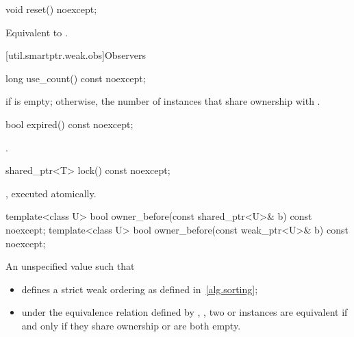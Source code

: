 %
\begin{itemdecl}
void reset() noexcept;
\end{itemdecl}

\begin{itemdescr}
\pnum
\effects
Equivalent to .
\end{itemdescr}

[util.smartptr.weak.obs]{Observers}
%
\begin{itemdecl}
long use_count() const noexcept;
\end{itemdecl}

\begin{itemdescr}
\pnum
\returns
{} if  is empty;
otherwise, the number of  instances
that share ownership with .
\end{itemdescr}

%
\begin{itemdecl}
bool expired() const noexcept;
\end{itemdecl}

\begin{itemdescr}
\pnum
\returns
{}.
\end{itemdescr}

%
\begin{itemdecl}
shared_ptr<T> lock() const noexcept;
\end{itemdecl}

\begin{itemdescr}
\pnum
\returns
{}, executed atomically.
\end{itemdescr}

%
\begin{itemdecl}
template<class U> bool owner_before(const shared_ptr<U>& b) const noexcept;
template<class U> bool owner_before(const weak_ptr<U>& b) const noexcept;
\end{itemdecl}

\begin{itemdescr}
\pnum
\returns
An unspecified value such that
\begin{itemize}
\item {} defines a strict weak ordering as defined in~\ref{alg.sorting};

\item under the equivalence relation defined by ,
, two  or
 instances are equivalent if and only if they share ownership or are
both empty.
\end{itemize}
\end{itemdescr}


